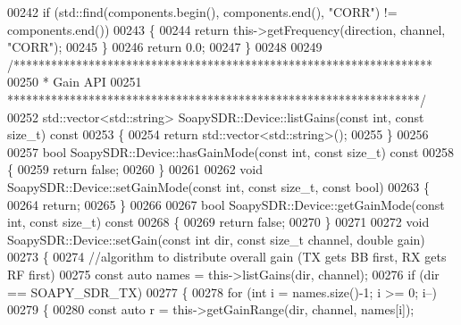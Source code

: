 \begin{DoxyCode}
00242     \textcolor{keywordflow}{if} (std::find(components.begin(), components.end(), \textcolor{stringliteral}{"CORR"}) != components.end())
00243     \{
00244         \textcolor{keywordflow}{return} this->getFrequency(direction, channel, \textcolor{stringliteral}{"CORR"});
00245     \}
00246     \textcolor{keywordflow}{return} 0.0;
00247 \}
00248 
00249 \textcolor{comment}{/*******************************************************************}
00250 \textcolor{comment}{ * Gain API}
00251 \textcolor{comment}{ ******************************************************************/}
00252 std::vector<std::string> SoapySDR::Device::listGains(\textcolor{keyword}{const} \textcolor{keywordtype}{int}, \textcolor{keyword}{const} \textcolor{keywordtype}{size\_t})\textcolor{keyword}{ const}
00253 \textcolor{keyword}{}\{
00254     \textcolor{keywordflow}{return} std::vector<std::string>();
00255 \}
00256 
00257 \textcolor{keywordtype}{bool} SoapySDR::Device::hasGainMode(\textcolor{keyword}{const} \textcolor{keywordtype}{int}, \textcolor{keyword}{const} \textcolor{keywordtype}{size\_t})\textcolor{keyword}{ const}
00258 \textcolor{keyword}{}\{
00259     \textcolor{keywordflow}{return} \textcolor{keyword}{false};
00260 \}
00261 
00262 \textcolor{keywordtype}{void} SoapySDR::Device::setGainMode(\textcolor{keyword}{const} \textcolor{keywordtype}{int}, \textcolor{keyword}{const} \textcolor{keywordtype}{size\_t}, \textcolor{keyword}{const} \textcolor{keywordtype}{bool})
00263 \{
00264     \textcolor{keywordflow}{return};
00265 \}
00266 
00267 \textcolor{keywordtype}{bool} SoapySDR::Device::getGainMode(\textcolor{keyword}{const} \textcolor{keywordtype}{int}, \textcolor{keyword}{const} \textcolor{keywordtype}{size\_t})\textcolor{keyword}{ const}
00268 \textcolor{keyword}{}\{
00269     \textcolor{keywordflow}{return} \textcolor{keyword}{false};
00270 \}
00271 
00272 \textcolor{keywordtype}{void} SoapySDR::Device::setGain(\textcolor{keyword}{const} \textcolor{keywordtype}{int} dir, \textcolor{keyword}{const} \textcolor{keywordtype}{size\_t} channel, \textcolor{keywordtype}{double} gain)
00273 \{
00274     \textcolor{comment}{//algorithm to distribute overall gain (TX gets BB first, RX gets RF first)}
00275     \textcolor{keyword}{const} \textcolor{keyword}{auto} names = this->listGains(dir, channel);
00276     \textcolor{keywordflow}{if} (dir == SOAPY_SDR_TX)
00277     \{
00278         \textcolor{keywordflow}{for} (\textcolor{keywordtype}{int} i = names.size()-1; i >= 0; i--)
00279         \{
00280             \textcolor{keyword}{const} \textcolor{keyword}{auto} r = this->getGainRange(dir, channel, names[i]);

\end{DoxyCode}
